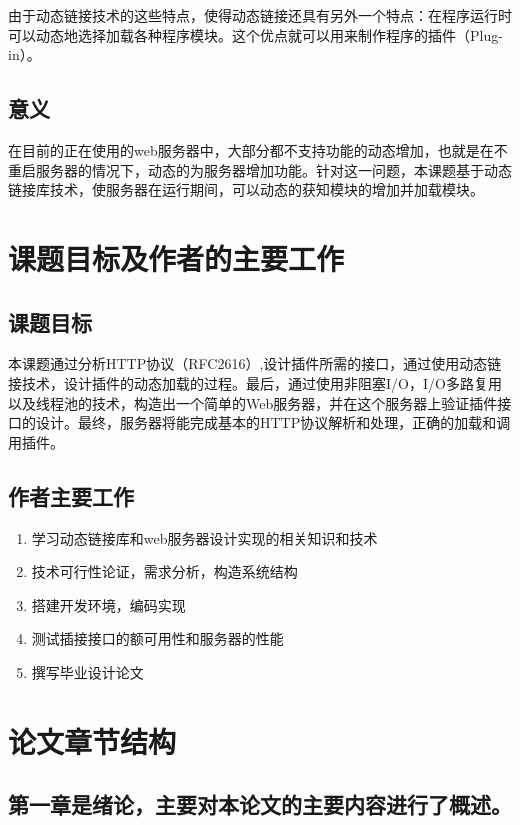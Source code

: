 \documentclass[12pt, twoside, a4paper, xetex]{report}
\begin{document}
	由于动态链接技术的这些特点，使得动态链接还具有另外一个特点：在程序运行时可以动态地选择加载各种程序模块。这个优点就可以用来制作程序的插件（Plug-in）。
\subsection{意义}
	在目前的正在使用的web服务器中，大部分都不支持功能的动态增加，也就是在不重启服务器的情况下，动态的为服务器增加功能。针对这一问题，本课题基于动态链接库技术，使服务器在运行期间，可以动态的获知模块的增加并加载模块。
	
\section{课题目标及作者的主要工作}
	\subsection{课题目标}
	本课题通过分析HTTP协议（RFC2616）,设计插件所需的接口，通过使用动态链接技术，设计插件的动态加载的过程。最后，通过使用非阻塞I/O，I/O多路复用以及线程池的技术，构造出一个简单的Web服务器，并在这个服务器上验证插件接口的设计。最终，服务器将能完成基本的HTTP协议解析和处理，正确的加载和调用插件。
	
	\subsection{作者主要工作}
	\begin{enumerate}
		\item 学习动态链接库和web服务器设计实现的相关知识和技术                                
		\item 技术可行性论证，需求分析，构造系统结构                                            
		\item 搭建开发环境，编码实现 
		\item 测试插接接口的额可用性和服务器的性能                                                                                              
		\item 撰写毕业设计论文                                                                  
	\end{enumerate}
	
\section{论文章节结构}
	\subsection*{第一章是绪论，主要对本论文的主要内容进行了概述。}
	
\end{document}
